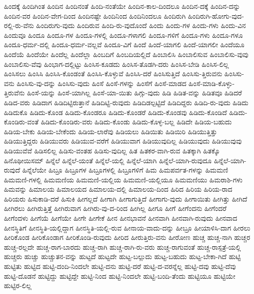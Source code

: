 {ಹಿಂದಕ್ಕೆ
ಹಿಂದಿಗಿಂತ
ಹಿಂದಿನ
ಹಿಂದಿನಂತೆ
ಹಿಂದಿ-ನಂತೆಯೇ
ಹಿಂದಿನ-ಕಾಲ-ದಿಂದಲೂ
ಹಿಂದಿನ-ದಕ್ಕೆ
ಹಿಂದಿನ-ದನ್ನು
ಹಿಂದಿನ-ವರ
ಹಿಂದಿನ-ವೇಗ-ದಿಂದ
ಹಿಂದಿನಷ್ಟೇ
ಹಿಂದಿನಿಂದ
ಹಿಂದಿನಿಂದಲೂ
ಹಿಂದಿರುಗಿ
ಹಿಂದಿರುಗಿ-ಹೋಗು-ವುದ-ರಲ್ಲಿ-ರು-ವೆನು
ಹಿಂದಿರುಗು-ವುದು
ಹಿಂದಿರುವ
ಹಿಂದಿ-ರು-ವುದೊಂದೆ
ಹಿಂದು
ಹಿಂದು-ಗಳ
ಹಿಂದು-ಗಳು
ಹಿಂದು-ವಿನ
ಹಿಂದುವೂ
ಹಿಂದೂ
ಹಿಂದೂ-ಗಳ
ಹಿಂದೂ-ಗಳಲ್ಲಿ
ಹಿಂದೂ-ಗಳಾಗಲಿ
ಹಿಂದೂ-ಗಳಿಗೆ
ಹಿಂದೂ-ಗಳು
ಹಿಂದೂ-ಗಳೂ
ಹಿಂದೂ-ಧರ್ಮ-ದಲ್ಲಿ
ಹಿಂದೂ-ಧರ್ಮ-ವಲ್ಲವೆ
ಹಿಂದೂ-ವಿಗೆ
ಹಿಂದೆ
ಹಿಂದೆ-ಯಾಗಲಿ
ಹಿಂದೆ-ಯಾಗಲೀ
ಹಿಂದೆಯೂ
ಹಿಂದೆಯೆ
ಹಿಂದೆಯೇ
ಹಿಂದೆಲ್ಲ
ಹಿಂದೆಲ್ಲಾ
ಹಿಂಬದಿಗೆ
ಹಿಂಬದಿಯಲ್ಲಿದೆ
ಹಿಂಬಾಲಿಸಿ
ಹಿಂಬಾಲಿಸುವ
ಹಿಂಬಾಲಿಸು-ವುವು
ಹಿಂಬಾಲಿಸು-ವೆವು
ಹಿಂಭಾಗ-ದಲ್ಲಿಟ್ಟು
ಹಿಂಸಿಸ-ಕೂಡದು
ಹಿಂಸಿಸ-ತೊಡಗಿ-ದರು
ಹಿಂಸಿಸ-ಬೇಡಿ
ಹಿಂಸಿಸ-ಲಿಲ್ಲ
ಹಿಂಸಿಸಲು
ಹಿಂಸಿಸಿ
ಹಿಂಸಿಸಿ-ಕೊಂಡಂತೆ
ಹಿಂಸಿಸಿ-ಕೊಳ್ಳುವೆ
ಹಿಂಸಿಸಿ-ದರೆ
ಹಿಂಸಿಸುತ್ತಿದೆ
ಹಿಂಸಿಸು-ತ್ತಿರುವನು
ಹಿಂಸಿಸು-ವನು
ಹಿಂಸಿಸು-ವು-ದನ್ನು
ಹಿಂಸಿಸು-ವುದು
ಹಿಂಸೆ
ಹಿಂಸೆ-ಗಳನ್ನು
ಹಿಂಸೆಗೆ
ಹಿಂಸೆ-ಮಾಡದ
ಹಿಂಸೆ-ಮಾಡಿ-ಕೊಳ್ಳು-ತ್ತಿರುವೆನು
ಹಿಂಸೆ-ಯನ್ನು
ಹಿಂಸೆ-ಯಾಗಿಲ್ಲ
ಹಿಂಸೆ-ಯಾ-ಯಿತು
ಹಿಗ್ಗು-ವುದು
ಹಿಡಿ
ಹಿಡಿತ-ವನ್ನು
ಹಿಡಿತವೂ
ಹಿಡಿದರೆ
ಹಿಡಿದ-ವರು
ಹಿಡಿದಾಗ
ಹಿಡಿದಿಟ್ಟಿರುತ್ತಾನೆ
ಹಿಡಿದಿಟ್ಟಿ-ರುವುದು
ಹಿಡಿದಿಡಲ್ಪಟ್ಟಿದೆ
ಹಿಡಿದಿದ್ದರು
ಹಿಡಿದಿ-ರು-ವುದು
ಹಿಡಿದು
ಹಿಡಿದುಕೊ
ಹಿಡಿದು-ಕೊಂಡ
ಹಿಡಿದು-ಕೊಂಡರೂ
ಹಿಡಿದು-ಕೊಂಡರೆ
ಹಿಡಿದು-ಕೊಂಡವು
ಹಿಡಿದು-ಕೊಂಡಿದೆ
ಹಿಡಿದು-ಕೊಂಡಿರು-ವಂತೆ
ಹಿಡಿದು-ಕೊಂಡಿರು-ವರು
ಹಿಡಿದು-ಕೊಂಡು
ಹಿಡಿದು-ಕೊಳ್ಳ-ಬಲ್ಲ
ಹಿಡಿದೇ
ಹಿಡಿಯ-ಬಹುದು
ಹಿಡಿಯ-ಬೇಕು
ಹಿಡಿಯ-ಬೇಕೆಂದು
ಹಿಡಿಯ-ಲಾರೆವು
ಹಿಡಿಯಲು
ಹಿಡಿಯಿತು
ಹಿಡಿಯಿರಿ
ಹಿಡಿಯುತ್ತಿತ್ತು
ಹಿಡಿಯುತ್ತಿದ್ದರು
ಹಿಡಿಯುವರು
ಹಿಡಿಯುವ-ವರೆಗೆ
ಹಿಡಿಯುವಾಗ
ಹಿಡಿಯುವುದಿಲ್ಲ
ಹಿಡಿಯುವುದು
ಹಿಡಿಯುವುವು
ಹಿಡಿಯುವೆವೆ
ಹಿಡಿಸಲಿಲ್ಲ
ಹಿಡಿಸು-ವಂತಹ
ಹಿಡಿಸು-ವುದಿಲ್ಲ
ಹಿತ
ಹಿತಕರ-ವಾಗಿ-ರುವ
ಹಿತಕ್ಕಾಗಿ
ಹಿತಕ್ಕೊ
ಹಿನೊಥೀಯಿಸಮ್
ಹಿನ್ನೆಲೆ
ಹಿನ್ನೆಲೆ-ಯಂತೆ
ಹಿನ್ನೆಲೆ-ಯಲ್ಲಿ
ಹಿನ್ನೆಲೆ-ಯಾಗಿ
ಹಿನ್ನೆಲೆ-ಯಾಗಿ-ರುವುದೂ
ಹಿನ್ನೆಲೆ-ಯಾಗಿ-ರುವುದೆ
ಹಿನ್ನೆಲೆಯೇ
ಹಿಬ್ರೂ
ಹಿಬ್ರೂಗಳ
ಹಿಬ್ರೂಗಳಲ್ಲಿ
ಹಿಬ್ರೂಗಳಿಗೆ
ಹಿಮ
ಹಿಮಪರ್ವತ-ಗಳನ್ನು
ಹಿಮಮಣಿ
ಹಿಮಮಣಿ-ಗಳಲ್ಲಿ
ಹಿಮಮಣಿಯ
ಹಿಮಮಣಿ-ಯಲ್ಲಿಯ
ಹಿಮಮಣಿ-ಯಲ್ಲಿಯೂ
ಹಿಮಮಣಿಯು
ಹಿಮರಾಶಿ-ಗಳು
ಹಿಮವನ್ನು
ಹಿಮಾಲಯ
ಹಿಮಾಲಯದ
ಹಿಮಾಲಯ-ದಲ್ಲಿ
ಹಿಮಾಲಯ-ದಿಂದ
ಹಿರಿದ
ಹಿರಿಯ
ಹಿರಿಯ-ರಾದ
ಹಿರಿಯರು
ಹಿಸುಕಾಡಿ-ದರೆ
ಹಿಸುಕಿ
ಹೀಗಲ್ಲದೆ
ಹೀಗಾಗಿ
ಹೀಗಾಗುತ್ತಿದೆ
ಹೀಗಾಗು-ವುದು
ಹೀಗಾಯಿತು
ಹೀಗಿತ್ತು
ಹೀಗಿದೆ
ಹೀಗಿರಲು
ಹೀಗಿರುತ್ತಿತ್ತೆ
ಹೀಗಿರುವಾಗ
ಹೀಗಿರು-ವು-ದ-ರಿಂದ
ಹೀಗಿಲ್ಲ
ಹೀಗೂ
ಹೀಗೆ
ಹೀಗೆಂದನು
ಹೀಗೆಂದರೆ
ಹೀಗೆಂದಳು
ಹೀಗೆಯೆ
ಹೀಗೆಯೇ
ಹೀಗೇ
ಹೀಗೇಕೆ
ಹೀನ
ಹೀನಭಾವನೆ
ಹೀನವಾಗಿ
ಹೀನವಾಗಿ-ರುವುದು
ಹೀನವಾದ
ಹೀನಸ್ಥಿತಿಗೆ
ಹೀನಸ್ಥಿತಿ-ಯಲ್ಲಿದ್ದಾಗ
ಹೀನಸ್ಥಿತಿ-ಯಲ್ಲಿ-ರುವ
ಹೀನಾಯ-ವಾದು-ದನ್ನು
ಹೀಬ್ರೂ
ಹೀಯಾಳಿಸಿ-ದಾಗ
ಹೀರಲು
ಹೀರಿಕೊಂಡ
ಹೀರಿಕೊಂಡಾಗ
ಹೀರಿಕೊಂಡಿ-ರುವುದು
ಹೀರಿದ
ಹೀರುತ್ತಿರು-ವನು
ಹೀರೋಣ
ಹುಚ್ಚ
ಹುಚ್ಚ-ನಾಗಿ
ಹುಚ್ಚರ
ಹುಚ್ಚ-ರಲ್ಲದೇ
ಹುಚ್ಚ-ರಾಗ-ಬಾರದು
ಹುಚ್ಚ-ರಾಗಿ
ಹುಚ್ಚ-ರಾಗಿ-ರು-ವರು
ಹುಚ್ಚ-ರಾಗುವಂತೆ
ಹುಚ್ಚ-ರಾಸ್ಪತ್ರೆ-ಯಲ್ಲಿ
ಹುಚ್ಚರು
ಹುಚ್ಚು
ಹುಚ್ಚುತನ-ವನ್ನು
ಹುಟ್ಟದೆ
ಹುಟ್ಟದೇ
ಹುಟ್ಟ-ಬಲ್ಲುದು
ಹುಟ್ಟ-ಬಹುದು
ಹುಟ್ಟ-ಬೇಕಾ-ಗಿದೆ
ಹುಟ್ಟಿ
ಹುಟ್ಟಿತು
ಹುಟ್ಟಿದ
ಹುಟ್ಟಿ-ದಂದಿ-ನಿಂದಲೇ
ಹುಟ್ಟಿ-ದನು
ಹುಟ್ಟಿ-ದರೆ
ಹುಟ್ಟಿ-ದ-ವರನ್ನೆಲ್ಲ
ಹುಟ್ಟಿ-ದವು
ಹುಟ್ಟಿ-ದೆವು
ಹುಟ್ಟಿ-ದೊಡನೆ
ಹುಟ್ಟಿದ್ದು
ಹುಟ್ಟಿದ್ದೇ
ಹುಟ್ಟಿ-ನಿಂದ
ಹುಟ್ಟಿ-ನಿಂದಲೇ
ಹುಟ್ಟಿ-ಬಂದಿ-ತೆಂದು
ಹುಟ್ಟಿಯೂ
ಹುಟ್ಟಿಯೇ
ಹುಟ್ಟಿರ-ಲಿಲ್ಲ
}
